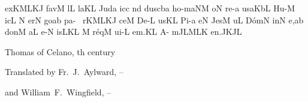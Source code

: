 \spatium
\sgn {}ex\engl{}\pessubbipunctis KMLK\nonspatium\punctuminclinatum J\egn
\spatium
\sgn fav\punctum M\egn
\sgn {}{\'\i}l\punctum L\egn
\sgn la{}\punctum K\augmentum L\egn
\spatium
\divisiofinalis
\spatium
\sgn Jud\punctum a\egn
\sgn {}ic\punctum c\egn
{}n\punctum d\egn
\sgn dus\climacus cba\egn
\spatium
\sgn ho{-m}\climacus aNM\egn
\sgn {}o{}\punctum N\egn
\spatium
\sgn re-\punctum a\egn
\sgn {}us\clivis aK\augmentumduplex bL\egn
\spatium
\divisiofinalis
\spatium
\sgn Hu-\punctum M\egn
\sgn {}ic\punctum L\egn
\spatium
\custos N
\lineaproxima
\sgn {}er\punctum N\egn
\sgn go{}\punctum a\augmentum b\egn
\spatium
\sgn pa{-~ r}\pessubbipunctis KMLK\nonspatium\punctuminclinatum J\egn
\sgn ce{}\punctum M\egn
\spatium
\sgn De-\punctum L\egn
\sgn {}us\punctum K\augmentum L\egn
\spatium
\divisiofinalis
\spatium
\sgn Pi-\punctum a\egn
\sgn {}e{}\punctum N\egn
\spatium
\sgn Jes\punctum M\egn
\sgn {}u{}\punctum L\egn
\spatium
\sgn D{\'o}m\punctum N\egn
\sgn {}in\punctum N\egn
\sgn {}e,\punctum a\augmentum b\egn
\spatium
\sgn don\punctum M\egn
\sgn {}a{}\punctum L\egn
\spatium
\sgn {}e-\punctum N\egn
\sgn {}is\porrectus LKL\egn
\spatium
\custos M
\lineaproxima
\sgn r{\'e}q\punctum M\egn
\sgn ui-\punctum L\egn
\sgn {}e{m.}\punctum K\augmentum L\egn
\spatium
\divisiofinalis
\spatium
\sgn {}A{- m}\pes JL\nonspatium\climacus MLK\egn
\sgn {}e{n.}\pes JK\augmentumduplex JL\egn
\spatium
\Finisgregoriana

\source Thomas of Celano, {}th century

\source Translated by Fr.~J.~Aylward, {}--{} 

\source and William~F.~Wingfield, {}--{}

